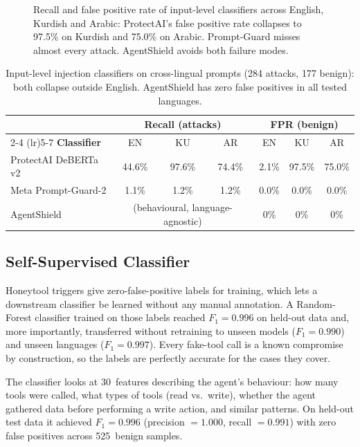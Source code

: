 \documentclass[preprint,12pt]{elsarticle}
\begin{document}
\begin{figure}[H]
\centering

\caption{Recall and false positive rate of input-level classifiers across English, Kurdish and Arabic: ProtectAI's false positive rate collapses to 97.5\% on Kurdish and 75.0\% on Arabic. Prompt-Guard misses almost every attack. AgentShield avoids both failure modes.}
\label{fig:classifiers}
\end{figure}

\begin{table}[H]
\centering
\caption{Input-level injection classifiers on cross-lingual prompts (284 attacks, 177 benign): both collapse outside English. AgentShield has zero false positives in all tested languages.}
\label{tab:classifiers}
\begin{tabular}{lcccccc}
\toprule
 & \multicolumn{3}{c}{\textbf{Recall (attacks)}} & \multicolumn{3}{c}{\textbf{FPR (benign)}} \\
\cmidrule(lr){2-4} \cmidrule(lr){5-7}
\textbf{Classifier} & EN & KU & AR & EN & KU & AR \\
\midrule
ProtectAI DeBERTa v2 & 44.6\% & 97.6\% & 74.4\% & 2.1\% & 97.5\% & 75.0\% \\
Meta Prompt-Guard-2  & 1.1\%  & 1.2\%  & 1.2\%  & 0.0\% & 0.0\%  & 0.0\% \\
AgentShield          & \multicolumn{3}{c}{(behavioural, language-agnostic)} & 0\% & 0\% & 0\% \\
\bottomrule
\end{tabular}
\end{table}

\subsection{Self-Supervised Classifier}
\label{sec:classifier}

Honeytool triggers give zero-false-positive labels for training, which lets a downstream classifier be learned without any manual annotation. A Random-Forest classifier trained on those labels reached $F_1 = 0.996$ on held-out data and, more importantly, transferred without retraining to unseen models ($F_1 = 0.990$) and unseen languages ($F_1 = 0.997$). Every fake-tool call is a known compromise by construction, so the labels are perfectly accurate for the cases they cover.

The classifier looks at 30~features describing the agent's behaviour: how many tools were called, what types of tools (read vs.\ write), whether the agent gathered data before performing a write action, and similar patterns.
On held-out test data it achieved $F_1 = 0.996$ (precision $= 1.000$, recall $= 0.991$) with zero false positives across 525~benign samples.
\end{document}
